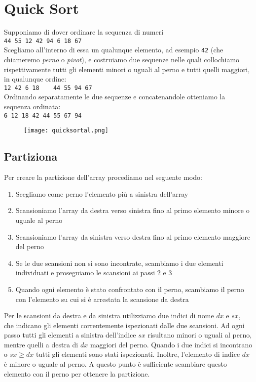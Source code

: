 \section{Quick Sort}
Supponiamo di dover ordinare la sequenza di numeri\\[12pt]
{\texttt{44 55 12 42 94 6 18 67}}\\[12pt]
Scegliamo all'interno di essa un qualunque elemento, ad esempio {\texttt{42}}
(che chiameremo {\emph{perno}} o {\emph{pivot}}), e costruiamo due sequenze nelle quali collochiamo
rispettivamente tutti gli elementi minori o uguali al perno e tutti quelli maggiori, in qualunque ordine:\\[12pt]
{\texttt{12 42 6 18 $\quad$ 44 55 94 67}}\\[12pt]
Ordinando separatamente le due sequenze e concatenandole otteniamo la 
sequenza ordinata:\\[12pt]
{\texttt{6 12 18 42 44 55 67 94}}\\[12pt]

\begin{figure}[h]
    \texttt{[image: quicksortal.png]}
\end{figure}

\subsection{Partiziona}

Per creare la partizione dell'array procediamo nel seguente modo:
\begin{enumerate}
    \item Scegliamo come perno l'elemento più a sinistra dell'array
    \item Scansioniamo l'array da destra verso sinistra fino al primo elemento minore o uguale al perno
    \item Scansioniamo l'array da sinistra verso destra fino al primo elemento maggiore del perno
    \item Se le due scansioni non si sono incontrate, scambiamo i due elementi individuati e proseguiamo le scansioni ai passi 2 e 3
    \item Quando ogni elemento è stato confrontato con il perno, scambiamo il perno con l'elemento su cui si è arrestata la scansione da destra 
\end{enumerate}

\noindent
Per le scansioni da destra e da sinistra utilizziamo due indici di nome 
$dx$ e $sx$, che indicano gli elementi correntemente ispezionati dalle due scansioni.
Ad ogni passo tutti gli elementi a sinistra dell'indice $sx$ risultano minori 
o uguali al perno, mentre quelli a destra di $dx$ maggiori del perno. Quando i due indici
si incontrano o $sx \ge dx$ tutti gli elementi sono stati ispezionati.
Inoltre, l'elemento di indice $dx$ è minore o uguale al perno. A questo punto
è sufficiente scambiare questo elemento con il perno per ottenere la partizione.

